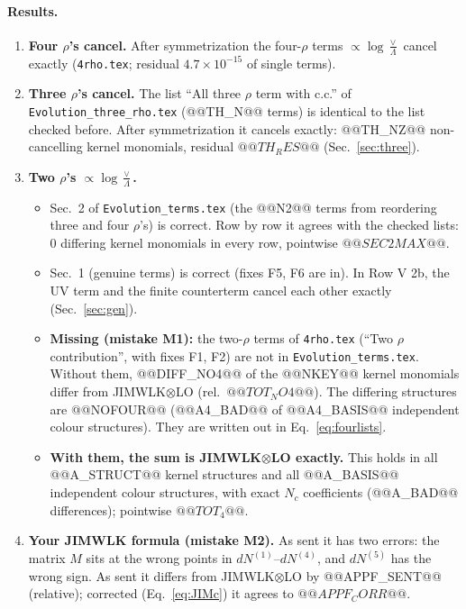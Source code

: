 \documentclass[10pt]{article}
\numberwithin{equation}{section}
\begin{document}
\paragraph{Results.}
\begin{enumerate}
\item \textbf{Four $\rho$'s cancel.} After symmetrization the four-$\rho$ terms $\propto\log\frac{\vee}{\Lambda}$ cancel exactly (\texttt{4rho.tex}; residual $4.7\times10^{-15}$ of single terms).
\item \textbf{Three $\rho$'s cancel.} The list ``All three $\rho$ term with c.c.'' of \texttt{Evolution\_three\_rho.tex} (@@TH_N@@ terms) is identical to the list checked before. After symmetrization it cancels exactly: @@TH_NZ@@ non-cancelling kernel monomials, residual $@@TH_RES@@$ (Sec.~\ref{sec:three}).
\item \textbf{Two $\rho$'s $\propto\log\frac{\vee}{\Lambda}$.}
\begin{itemize}
\item Sec.~2 of \texttt{Evolution\_terms.tex} (the @@N2@@ terms from reordering three and four $\rho$'s) is correct. Row by row it agrees with the checked lists: 0 differing kernel monomials in every row, pointwise $@@SEC2MAX@@$.
\item Sec.~1 (genuine terms) is correct (fixes F5, F6 are in). In Row V 2b, the UV term and the finite counterterm cancel each other exactly (Sec.~\ref{sec:gen}).
\item \textbf{Missing (mistake M1):} the two-$\rho$ terms of \texttt{4rho.tex} (``Two $\rho$ contribution'', with fixes F1, F2) are not in \texttt{Evolution\_terms.tex}. Without them, @@DIFF_NO4@@ of the @@NKEY@@ kernel monomials differ from JIMWLK$\otimes$LO (rel.\ $@@TOT_NO4@@$). The differing structures are @@NOFOUR@@ (@@A4_BAD@@ of @@A4_BASIS@@ independent colour structures). They are written out in Eq.~\eqref{eq:fourlists}.
\item \textbf{With them, the sum is JIMWLK$\otimes$LO exactly.} This holds in all @@A_STRUCT@@ kernel structures and all @@A_BASIS@@ independent colour structures, with exact $N_c$ coefficients (@@A_BAD@@ differences); pointwise $@@TOT_4@@$.
\end{itemize}
\item \textbf{Your JIMWLK formula (mistake M2).} As sent it has two errors: the matrix $M$ sits at the wrong points in $dN^{(1)}$--$dN^{(4)}$, and $dN^{(5)}$ has the wrong sign. As sent it differs from JIMWLK$\otimes$LO by @@APPF_SENT@@ (relative); corrected (Eq.~\eqref{eq:JIMc}) it agrees to $@@APPF_CORR@@$.

\end{enumerate}
\end{document}
